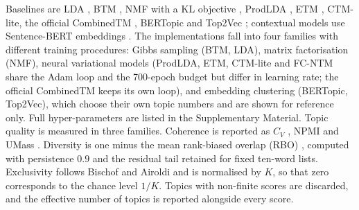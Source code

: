 \documentclass[pdflatex,sn-basic]{sn-jnl}
\newcommand{\fcntm}{FC-NTM}
\begin{document}
Baselines are LDA \cite{blei2003lda}, BTM \cite{yan2013btm}, NMF with a KL objective
\cite{lee2001nmf}, ProdLDA \cite{srivastava2017avitm}, ETM \cite{dieng2020etm}, CTM-lite, the
official CombinedTM \cite{bianchi2021ctm}, BERTopic \cite{grootendorst2022bertopic} and Top2Vec
\cite{angelov2020top2vec}; contextual models use Sentence-BERT embeddings \cite{reimers2019sbert}.
The implementations fall into four families with different training procedures: Gibbs sampling
(BTM, LDA), matrix factorisation (NMF), neural variational models (ProdLDA, ETM, CTM-lite and
\fcntm{} share the Adam loop \cite{kingma2015adam} and the 700-epoch budget but differ in learning
rate; the official CombinedTM keeps its own loop), and embedding clustering (BERTopic, Top2Vec),
which choose their own topic numbers and are shown for reference only. Full hyper-parameters are
listed in the Supplementary Material. Topic quality is measured in three families. Coherence is
reported as $C_V$ \cite{roder2015coherence}, NPMI \cite{bouma2009npmi,lau2014tea} and UMass
\cite{newman2010coherence,mimno2011coherence}. Diversity is one minus the mean rank-biased overlap
(RBO) \cite{webber2010rbo}, computed with persistence $0.9$ and the residual tail retained for
fixed ten-word lists. Exclusivity follows Bischof and Airoldi \cite{bischof2012exclusivity} and is
normalised by $K$, so that zero corresponds to the chance level $1/K$. Topics with non-finite
scores are discarded, and the effective number of topics is reported alongside every score.
\end{document}
